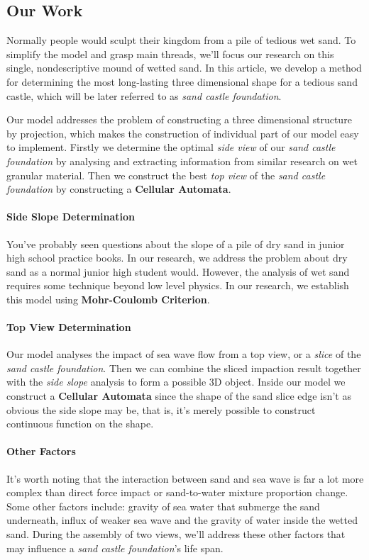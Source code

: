 \documentclass[12pt]{article}
\begin{document}
\subsection{Our Work}
Normally people would sculpt their kingdom from a pile of tedious wet sand. To simplify the model and grasp main threads, we'll focus our research on this single, nondescriptive mound of wetted sand. In this article, we develop a method for determining the most long-lasting three dimensional shape for a tedious sand castle, which will be later referred to as \textit{sand castle foundation}.
\par
Our model addresses the problem of constructing a three dimensional structure by projection, which makes the construction of individual part of our model easy to implement. Firstly we determine the optimal \textit{side view} of our \textit{sand castle foundation} by analysing and extracting information from similar research on wet granular material\autocite{mitarai2006wet}. Then we construct the best \textit{top view} of the \textit{sand castle foundation} by constructing a \textbf{Cellular Automata}.

\paragraph{Side Slope Determination}
You've probably seen questions about the slope of a pile of dry sand in junior high school practice books. In our research, we address the problem about dry sand as a normal junior high student would. However, the analysis of wet sand requires some technique beyond low level physics. In our research, we establish this model using \textbf{Mohr-Coulomb Criterion}.

\paragraph{Top View Determination}
Our model analyses the impact of sea wave flow from a top view, or a \textit{slice} of the \textit{sand castle foundation}. Then we can combine the sliced impaction result together with the \textit{side slope} analysis to form a possible 3D object. Inside our model we construct a \textbf{Cellular Automata} since the shape of the sand slice edge isn't as obvious the side slope may be, that is, it's merely possible to construct continuous function on the shape.

\paragraph{Other Factors}
It's worth noting that the interaction between sand and sea wave is far a lot more complex than direct force impact or sand-to-water mixture proportion change. Some other factors include: gravity of sea water that submerge the sand underneath, influx of weaker sea wave and the gravity of water inside the wetted sand. During the assembly of two views, we'll address these other factors that may influence a \textit{sand castle foundation}'s life span.
\end{document}
